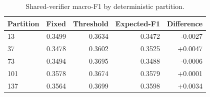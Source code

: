 \begin{table}[t]
\centering
\caption{Shared-verifier macro-F1 by deterministic partition.}
\label{tab:verifier-effects}
\begin{tabular}{lrrrr}
\toprule
Partition & Fixed & Threshold & Expected-F1 & Difference \\
\midrule
13 & 0.3499 & 0.3634 & 0.3472 & -0.0027 \\
37 & 0.3478 & 0.3602 & 0.3525 & +0.0047 \\
73 & 0.3494 & 0.3695 & 0.3488 & -0.0006 \\
101 & 0.3578 & 0.3674 & 0.3579 & +0.0001 \\
137 & 0.3564 & 0.3699 & 0.3598 & +0.0034 \\
\bottomrule
\end{tabular}
\end{table}
